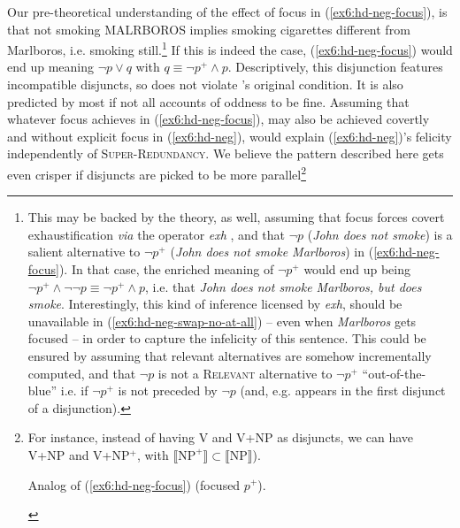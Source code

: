 Our pre-theoretical understanding of the effect of focus in (\ref{ex6:hd-neg-focus}), is that not smoking MALRBOROS implies smoking cigarettes different from Marlboros, i.e. smoking still.\footnote{\label{fn:exh-marlboros}This may be backed by the theory, as well, assuming that focus forces covert exhaustification \textit{via} the operator \textit{exh} \parencite{Fox2007,Chierchia2009}, and that $\neg p$ (\textit{John does not smoke}) is a salient alternative to $\neg p^+$ (\textit{John does not smoke Marlboros}) in (\ref{ex6:hd-neg-focus}). In that case, the enriched meaning of $\neg p^+$ would end up being $\neg p^+ \wedge \neg\neg p \equiv \neg p^+ \wedge p$, i.e. that \textit{John does not smoke Marlboros, but does smoke}. Interestingly, this kind of inference licensed by \textit{exh}, should be unavailable in (\ref{ex6:hd-neg-swap-no-at-all}) -- even when \textit{Marlboros} gets focused -- in order to capture the infelicity of this sentence. This could be ensured by assuming that relevant alternatives are somehow incrementally computed, and that $\neg p$ is not a \textsc{Relevant} alternative to $\neg p^+$ ``out-of-the-blue'' i.e. if $\neg p^+$ is not preceded by $\neg p$ (and, e.g. appears in the first disjunct of a disjunction).} If this is indeed the case, (\ref{ex6:hd-neg-focus}) would end up meaning $\neg p \vee q$ with $q \equiv \neg p^+ \wedge p$. Descriptively, this disjunction features incompatible disjuncts, so does not violate \citeauthor{Hurford1974}'s original condition. It is also predicted by most if not all accounts of oddness to be fine. Assuming that whatever focus achieves in (\ref{ex6:hd-neg-focus}), may also be achieved covertly and without explicit focus in (\ref{ex6:hd-neg}), would explain (\ref{ex6:hd-neg})'s felicity independently of \textsc{Super-Redundancy}. We believe the pattern described here gets even crisper if disjuncts are picked to be more parallel\footnote{For instance, instead of having V and V+NP as disjuncts, we can have V+NP and V+NP$^+$, with $\llbracket \text{NP}^+\rrbracket \subset \llbracket \text{NP}\rrbracket$).
	\begin{exe}
		\begin{xlist}
			\label{ex6:hd-neg-original}
			\label{ex6:hd-neg-swapped}
			\label{ex6:hd-neg-swapped-at-all}
		\end{xlist}
		\ex Analog of (\ref{ex6:hd-neg-focus}) (focused $p^+$).
		\begin{xlist}
			\ex {John either doesn't own a dog or doesn't own a LAB.}
		\end{xlist}
\end{exe}}\\


